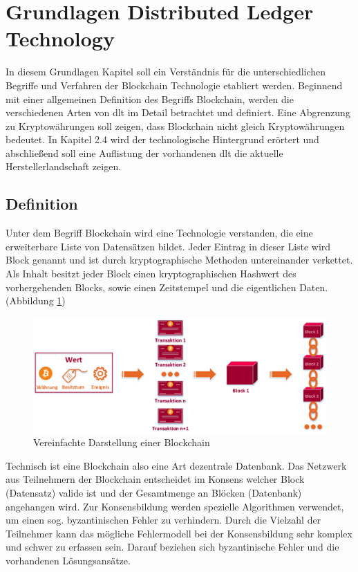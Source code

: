 \section{Grundlagen Distributed Ledger Technology}
In diesem Grundlagen Kapitel soll ein Verständnis für die unterschiedlichen Begriffe und Verfahren der Blockchain Technologie etabliert werden. Beginnend mit einer allgemeinen Definition des Begriffs Blockchain, werden die verschiedenen Arten von \ac{dlt} im Detail betrachtet und definiert. Eine Abgrenzung zu Kryptowährungen soll zeigen, dass Blockchain nicht gleich Kryptowährungen bedeutet. In Kapitel 2.4 wird der technologische Hintergrund erörtert und abschließend soll eine Auflistung der vorhandenen \ac{dlt} die aktuelle Herstellerlandschaft zeigen.

\subsection{Definition}
Unter dem Begriff Blockchain wird eine Technologie verstanden, die eine erweiterbare Liste von Datensätzen bildet. Jeder Eintrag in dieser Liste wird Block genannt und ist durch kryptographische Methoden untereinander verkettet. Als Inhalt besitzt jeder Block einen kryptographischen Hashwert des vorhergehenden Blocks, sowie einen Zeitstempel und die eigentlichen Daten.\cite[Vgl.]{narayanan2016bitcoin} (Abbildung \ref{fig:simple-blockchain-schema})
\begin{figure}[h!]
	\centering
	\includegraphics[width=1.0\linewidth]{pictures/simple-blockchain-schema}
	\caption[Vereinfachte Darstellung einer Blockchain]{Vereinfachte Darstellung einer Blockchain\cite{Gayvoronskaya2017}}
	\label{fig:simple-blockchain-schema}
\end{figure}

Technisch ist eine Blockchain also eine Art dezentrale Datenbank. Das Netzwerk aus Teilnehmern der Blockchain entscheidet im Konsens welcher Block (Datensatz) valide ist und der Gesamtmenge an Blöcken (Datenbank) angehangen wird. Zur Konsensbildung werden spezielle Algorithmen verwendet, um einen sog. byzantinischen Fehler zu verhindern. Durch die Vielzahl der Teilnehmer kann das mögliche Fehlermodell bei der Konsensbildung sehr komplex und schwer zu erfassen sein. Darauf beziehen sich byzantinische Fehler und die vorhandenen Lösungsansätze.

